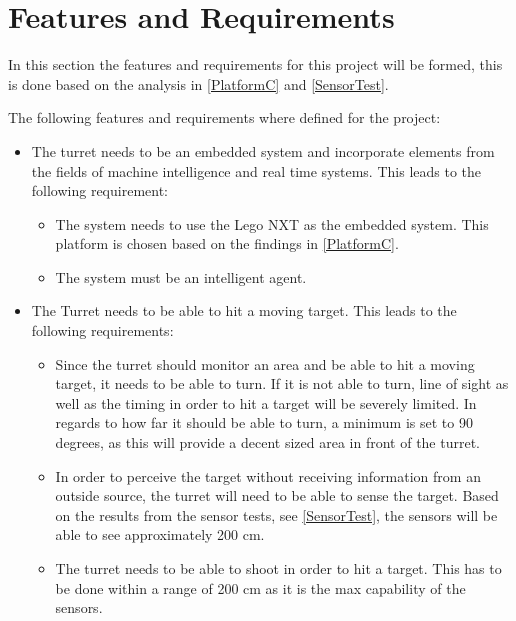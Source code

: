 \section{Features and Requirements}\label{FeatAndReq}
In this section the features and requirements for this project will be formed,
this is done based on the analysis in \autoref{PlatformC} and
\autoref{SensorTest}.

The following features and requirements where defined for the project:
\begin{itemize}
  \item The turret needs to be an embedded system and incorporate elements from
  the fields of machine intelligence and real time systems. This leads to the
  following requirement:
  \begin{itemize}
    \item The system needs to use the Lego NXT as the embedded
    system. This platform is chosen based on the findings in
    \autoref{PlatformC}. 
    \item The system must be an intelligent agent.
  \end{itemize}
  \item The Turret needs to be able to hit a moving target. This leads to the
  following requirements:
  \begin{itemize}
    \item Since the turret should monitor an area and be able to hit a moving
    target, it needs to be able to turn. If it is not able to turn, line of
    sight as well as the timing in order to hit a target will be severely
    limited. In regards to how far it should be able to turn, a minimum is set
    to 90 degrees, as this will provide a decent sized area in front of the turret.
    \item In order to perceive the target without receiving information from an
    outside source, the turret will need to be able to sense the target. Based
    on the results from the sensor tests, see \autoref{SensorTest}, the sensors
    will be able to see approximately 200 cm.    
    \item The turret needs to be able to shoot in order to hit a
    target. This has to be done within a range of 200 cm as it is the max
    capability of the sensors. 
    

\end{itemize}
\end{itemize}
